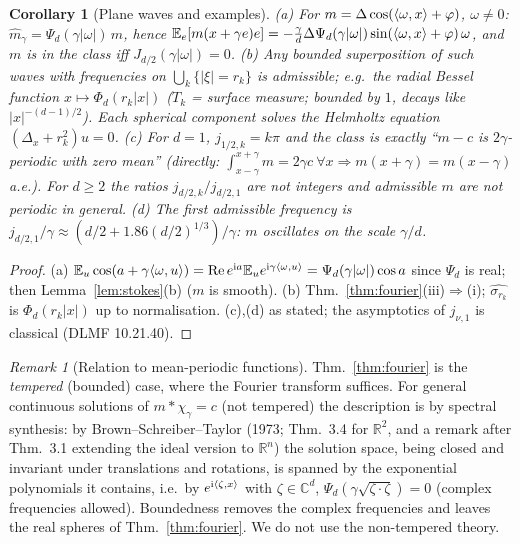\documentclass[11pt,a4paper]{article}
\numberwithin{equation}{section}
\newtheorem{corollary}[theorem]{Corollary}
\theoremstyle{definition}
\theoremstyle{remark}
\newtheorem{remark}[theorem]{Remark}
\newcommand{\E}{\mathbb E}\newcommand{\R}{\mathbb R}\newcommand{\N}{\mathbb N}\newcommand{\Prob}{\mathbb P}
\begin{document}
\begin{corollary}[Plane waves and examples]\label{cor:waves}
(a) For $m=\Delta\cos(\langle \omega,x\rangle+\varphi)$, $\omega\ne0$: $\hat m_\gamma=\Psi_d(\gamma|\omega|)\,m$, hence $\E_e[m(x+\gamma e)e]=-\frac\gamma d\Delta\Psi_d(\gamma|\omega|)\sin(\ip\omega x+\varphi)\,\omega$, and $m$ is in the class iff $J_{d/2}(\gamma|\omega|)=0$.
(b) Any bounded superposition of such waves with frequencies on $\bigcup_k\{|\xi|=r_k\}$ is admissible; e.g.\ the radial Bessel function $x\mapsto\Phi_d(r_k|x|)$ ($T_k$ = surface measure; bounded by $1$, decays like $|x|^{-(d-1)/2}$). Each spherical component solves the Helmholtz equation $(\Delta_x+r_k^2)u=0$.
(c) For $d=1$, $j_{1/2,k}=k\pi$ and the class is exactly ``$m-c$ is $2\gamma$-periodic with zero mean'' (directly: $\int_{x-\gamma}^{x+\gamma}m=2\gamma c\ \forall x\Rightarrow m(x+\gamma)=m(x-\gamma)$ a.e.). For $d\ge2$ the ratios $j_{d/2,k}/j_{d/2,1}$ are not integers and admissible $m$ are not periodic in general.
(d) The first admissible frequency is $j_{d/2,1}/\gamma\approx(d/2+1.86(d/2)^{1/3})/\gamma$: $m$ oscillates on the scale $\gamma/d$.
\end{corollary}
\begin{proof}
(a) $\E_u\cos(a+\gamma\ip\omega u)=\mathrm{Re}\,e^{\mathrm ia}\E_ue^{\mathrm i\gamma\ip\omega u}=\Psi_d(\gamma|\omega|)\cos a$ since $\Psi_d$ is real; then Lemma~\ref{lem:stokes}(b) ($m$ is smooth). (b) Thm.~\ref{thm:fourier}(iii)$\Rightarrow$(i); $\widehat{\sigma_{r_k}}$ is $\Phi_d(r_k|x|)$ up to normalisation. (c),(d) as stated; the asymptotics of $j_{\nu,1}$ is classical (DLMF 10.21.40).
\end{proof}

\begin{remark}[Relation to mean-periodic functions]
Thm.~\ref{thm:fourier} is the \emph{tempered} (bounded) case, where the Fourier transform suffices. For general continuous solutions of $m*\chi_\gamma=c$ (not tempered) the description is by spectral synthesis: by Brown--Schreiber--Taylor (1973; Thm.~3.4 for $\R^2$, and a remark after Thm.~3.1 extending the ideal version to $\R^n$) the solution space, being closed and invariant under translations and rotations, is spanned by the exponential polynomials it contains, i.e.\ by $e^{\mathrm i\langle \zeta,x\rangle}$ with $\zeta\in\mathbb C^d$, $\Psi_d(\gamma\sqrt{\zeta\cdot\zeta})=0$ (complex frequencies allowed). Boundedness removes the complex frequencies and leaves the real spheres of Thm.~\ref{thm:fourier}. We do not use the non-tempered theory.
\end{remark}
\end{document}
